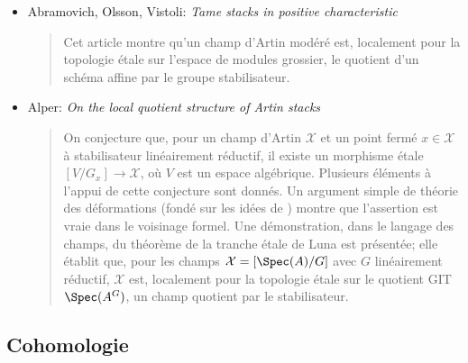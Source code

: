 \begin{itemize}
\begin{quote}
$U$ est affine et $G$ un groupe fini. Dans cet argument,
\cite[théorème 2.12]{olsson_homstacks} montre même que $G$ est le groupe stabilisateur.
\end{quote}
\item Abramovich, Olsson, Vistoli:
\emph{Tame stacks in positive characteristic} \cite{tame}
\begin{quote}
Cet article montre qu'un champ d'Artin modéré est, localement pour la topologie étale
sur l'espace de modules grossier, le quotient d'un schéma affine par le groupe
stabilisateur.
\end{quote}
\item Alper: \emph{On the local quotient structure of Artin stacks}
\cite{alper_quotient}
\begin{quote}
On conjecture que, pour un champ d'Artin $\mathcal{X}$ et un point fermé $x
\in \mathcal{X}$
à stabilisateur linéairement réductif, il existe un morphisme étale $[V/G_x]
\to \mathcal{X}$, où $V$ est un espace algébrique. Plusieurs éléments à l'appui de
cette conjecture sont
donnés. Un argument simple de théorie des déformations (fondé sur les idées de
\cite{tame}) montre que l'assertion est vraie dans le voisinage formel. Une
démonstration, dans le langage des champs, du théorème de la tranche étale de Luna
est présentée; elle établit que, pour les champs
$\mathcal{X} = [\Spec(A)/G]$
avec $G$ linéairement réductif, $\mathcal{X}$ est, localement pour la topologie étale
sur le quotient GIT $\Spec(A^G)$, un champ quotient par le stabilisateur.
\end{quote}
\end{itemize}

\subsection{Cohomologie}
\label{subsection-cohomology}

